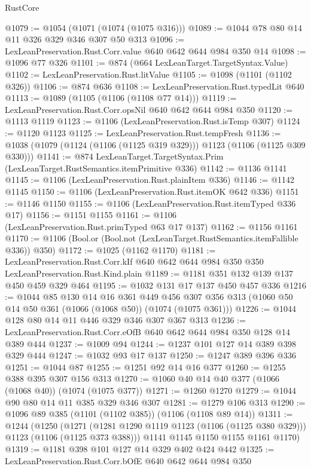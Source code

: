 \begin{lexlean}{RustCore}
\begin{coremodule}
@1079 := @1054 (@1071 (@1074 (@1075 @316)))
@1089 := @1044 @78 @80 @14 @11 @326 @329 @346 @307 @50 @313
@1096 := LexLeanPreservation.Rust.Corr.value @640 @642 @644 @984 @350 @14
@1098 := @1096 @77 @326
@1101 := @874 (@664 LexLeanTarget.TargetSyntax.Value)
@1102 := LexLeanPreservation.Rust.litValue
@1105 := @1098 (@1101 (@1102 @326))
@1106 := @874 @636
@1108 := LexLeanPreservation.Rust.typedLit @640
@1113 := @1089 (@1105 (@1106 (@1108 @77 @14)))
@1119 := LexLeanPreservation.Rust.Corr.opsNil @640 @642 @644 @984 @350
@1120 := @1113 @1119
@1123 := @1106 (LexLeanPreservation.Rust.isTemp @307)
@1124 := @1120 @1123
@1125 := LexLeanPreservation.Rust.tempFresh
@1136 := @1038 (@1079 (@1124 (@1106 (@1125 @319 @329))) @1123 (@1106 (@1125 @309 @330)))
@1141 := @874 LexLeanTarget.TargetSyntax.Prim (LexLeanTarget.RustSemantics.itemPrimitive @336)
@1142 := @1136 @1141
@1145 := @1106 (LexLeanPreservation.Rust.plainItem @336)
@1146 := @1142 @1145
@1150 := @1106 (LexLeanPreservation.Rust.itemOK @642 @336)
@1151 := @1146 @1150
@1155 := @1106 (LexLeanPreservation.Rust.itemTyped @336 @17)
@1156 := @1151 @1155
@1161 := @1106 (LexLeanPreservation.Rust.primTyped @63 @17 @137)
@1162 := @1156 @1161
@1170 := @1106 (Bool.or (Bool.not (LexLeanTarget.RustSemantics.itemFallible @336)) @350)
@1172 := @1025 (@1162 @1170)
@1181 := LexLeanPreservation.Rust.Corr.kIf
    @640
    @642
    @644
    @984
    @350
    @350
    LexLeanPreservation.Rust.Kind.plain
@1189 := @1181 @351 @132 @139 @137 @450 @459 @329 @464
@1195 := @1032 @131 @17 @137 @450 @457 @336
@1216 := @1044
    @85
    @130
    @14
    @16
    @361
    @449
    @456
    @307
    @356
    @313
    (@1060 @50 @14 @50 @361 (@1066 (@1068 @50)) (@1074 (@1075 @361)))
@1226 := @1044 @128 @80 @14 @11 @446 @329 @346 @307 @367 @313
@1236 := LexLeanPreservation.Rust.Corr.eOfB @640 @642 @644 @984 @350 @128 @14 @389 @444
@1237 := @1009 @94
@1244 := @1237 @101 @127 @14 @389 @398 @329 @444
@1247 := @1032 @93 @17 @137
@1250 := @1247 @389 @396 @336
@1251 := @1044 @87
@1255 := @1251 @92 @14 @16 @377
@1260 := @1255 @388 @395 @307 @156 @313
@1270 := @1060 @40 @14 @40 @377 (@1066 (@1068 @40)) (@1074 (@1075 @377))
@1271 := @1260 @1270
@1279 := @1044 @90 @80 @14 @11 @385 @329 @346 @307
@1281 := @1279 @106 @313
@1290 := @1096 @89 @385 (@1101 (@1102 @385)) (@1106 (@1108 @89 @14))
@1311 := @1244
    (@1250
      (@1271 (@1281 @1290 @1119 @1123 (@1106 (@1125 @380 @329))) @1123 (@1106 (@1125 @373 @388)))
      @1141
      @1145
      @1150
      @1155
      @1161
      @1170)
@1319 := @1181 @398 @101 @127 @14 @329 @402 @424 @442
@1325 := LexLeanPreservation.Rust.Corr.bOfE @640 @642 @644 @984 @350

\end{coremodule}
\end{lexlean}
